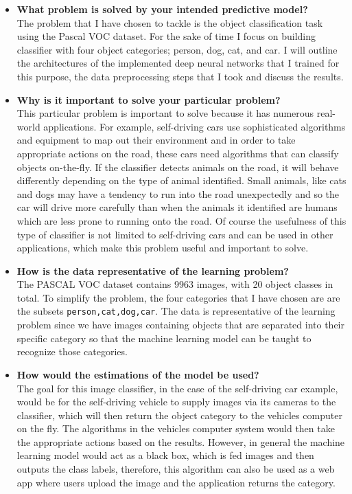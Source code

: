 \documentclass[10pt,a4paper]{article}
\begin{document}
\begin{itemize}
\item {\bf What problem is solved by your intended predictive model?}\\ 
The problem that I have chosen to tackle is the object classification task using the Pascal VOC dataset. For the sake of time I focus on building classifier with four object categories; person, dog, cat, and car. I will outline the architectures of the implemented deep neural networks that I trained for this purpose, the data preprocessing steps that I took and discuss the results.

\item {\bf Why is it important to solve your particular problem?} \\
This particular problem is important to solve because it has numerous real-world applications. For example, self-driving cars use sophisticated algorithms and equipment to map out their environment and in order to take appropriate actions on the road, these cars need algorithms that can classify objects on-the-fly. If the classifier detects animals on the road, it will behave differently depending on the type of animal identified. Small animals, like cats and dogs may have a tendency to run into the road unexpectedly and so the car will drive more carefully than when the animals it identified are humans which are less prone to running onto the road. Of course the usefulness of this type of classifier is not limited to self-driving cars and can be used in other applications, which make this problem useful and important to solve.

\item {\bf How is the data representative of the learning problem?}\\
The PASCAL VOC dataset contains 9963 images, with 20 object classes in total. To simplify the problem, the four categories that I have chosen are are the subsets \lstinline{person,cat,dog,car}. The data is representative of the learning problem since we have images containing objects that are separated into their specific category so that the machine learning model can be taught to recognize those categories. 

\item {\bf How would the estimations of the model be used?}\\
The goal for this image classifier, in the case of the self-driving car example, would be for the self-driving vehicle to supply images via its cameras to the classifier, which will then return the object category to the vehicles computer on the fly. The algorithms in the vehicles computer system would then take the appropriate actions based on the results. However, in general the machine learning model would act as a black box, which is fed images and then outputs the class labels, therefore, this algorithm can also be used as a web app where users upload the image and the application returns the category.
\end{itemize}
 
\end{document}
